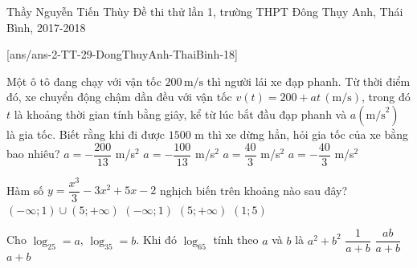 
\begin{name}
{Thầy Nguyễn Tiến Thùy}
{Đề thi thử lần 1, trường THPT Đông Thụy Anh, Thái Bình, 2017-2018}
\end{name}
\setcounter{ex}{0}\setcounter{bt}{0}
[ans/ans-2-TT-29-DongThuyAnh-ThaiBinh-18]
\begin{ex}%
Một ô tô đang chạy với vận tốc $200\mathrm{\,m/s}$ thì người lái xe đạp phanh. Từ thời điểm đó, xe chuyển động chậm dần đều với vận tốc $v\left(t\right)=200+at\, \left(\text{m/s}\right)$, trong đó $t$ là khoảng thời gian tính bằng giây, kể từ lúc bắt đầu đạp phanh và $a\left( \text{m/s}^2\right)$ là gia tốc. Biết rằng khi đi được $1500$ m thì xe dừng hẳn, hỏi gia tốc của xe bằng bao nhiêu?
\choice
{$a=-\dfrac{200}{13}$ m/s$^2$}
{$a=-\dfrac{100}{13}$ m/s$^2$}	
{$a=\dfrac{40}{3}$ m/s$^2$}	
{\True $a=-\dfrac{40}{3}$ m/s$^2$}
\end{ex}

\begin{ex}%
Hàm số $y=\dfrac{x^{3}}{3}-3x^{2}+5x-2$ nghịch biến trên khoảng nào sau đây?
\choice
{$\left( -\infty ;1 \right)\cup (5;+\infty )$}  
{$(-\infty; 1)$}  
{$(5; +\infty)$}  
{\True $(1; 5)$}
\end{ex}

\begin{ex}%
Cho $\log_25=a$, $\log_35=b$. Khi đó $\log_65$ tính theo $a$ và $b$ là
\choice
{$a^2+b^2$}  
{$\dfrac{1}{a+b}$}  
{\True $\dfrac{ab}{a+b}$}  
{$a+b$}
\end{ex}

